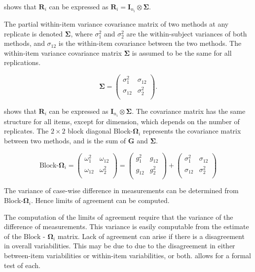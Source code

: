 \documentclass[12pt, a4paper]{report}
\theoremstyle{plain}
\theoremstyle{definition}
\theoremstyle{remark}
\begin{document}
	
	\citet{hamlett} shows that $\boldsymbol{R}_{i}$  can be expressed as $\boldsymbol{R}_{i} = \boldsymbol{I}_{n_{i}} \otimes \boldsymbol{\Sigma}$. 
	
The partial within-item variance covariance matrix of two methods at any replicate is denoted $\boldsymbol{\Sigma}$, where $\sigma^2_{1}$ and $\sigma^2_{2}$ are the within-subject variances of both methods, and $\sigma_{12}$ is the within-item covariance between the two methods. The within-item variance covariance matrix $\boldsymbol{\Sigma}$ is assumed to be the same for all replications.

\[
\boldsymbol{\Sigma} = \left( \begin{array}{cc}
\sigma^2_{1} & \sigma_{12} \\
\sigma_{12} & \sigma^2_{2} \\
\end{array}\right).
\]	

\citet{hamlett} shows that $\boldsymbol{R}_{i}$  can be expressed as $\boldsymbol{I}_{n_{i}} \otimes \boldsymbol{\Sigma}$. The covariance matrix has the same structure for all items, except for dimension, which depends on the number of replicates. The $2 \times 2$ block diagonal Block-$\boldsymbol{\Omega}_{i}$ represents the covariance matrix between two methods, and is the sum of $\boldsymbol{G}$ and $\boldsymbol{\Sigma}$.
	
	\[ \textrm{Block-}\boldsymbol{\Omega}_{i}  = \left(\begin{array}{cc}
	\omega^2_1  & \omega_{12} \\
	\omega_{12} & \omega^2_2 \\
	\end{array}  \right)
	=  \left(
	\begin{array}{cc}
	g^2_1  & g_{12} \\
	g_{12} & g^2_2 \\
	\end{array} \right)+
	\left(
	\begin{array}{cc}
	\sigma^2_1  & \sigma_{12} \\
	\sigma_{12} & \sigma^2_2 \\
	\end{array}\right)
	\]
	
	The variance of case-wise difference in measurements can be determined from Block-$\boldsymbol{\Omega}_{i}$. Hence limits of agreement can be computed.
	
	
	The computation of the limits of agreement require that the variance of the difference of measurements. This variance is easily computable from the estimate of the ${\mbox{Block - }\boldsymbol \Omega_{i}}$ matrix. Lack of agreement can arise if there is a disagreement in overall variabilities. This may be due to due to the disagreement in either between-item
	variabilities or within-item variabilities, or both. \citet{ARoy2009} allows for a formal test of each.
	\newpage
	
\end{document}
